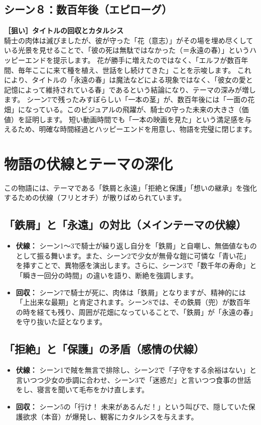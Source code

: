 \subsection{シーン８：数百年後（エピローグ）}
\textbf{［狙い］タイトルの回収とカタルシス} \\
騎士の肉体は滅びましたが、彼が守った「花（意志）」がその場を埋め尽くしている光景を見せることで、「彼の死は無駄ではなかった（＝永遠の春）」というハッピーエンドを提示します。
花が勝手に増えたのではなく、「エルフが数百年間、毎年ここに来て種を植え、世話をし続けてきた」ことを示唆します。
これにより、タイトルの「永遠の春」は魔法などによる現象ではなく、「彼女の愛と記憶によって維持されている春」であるという結論になり、テーマの深みが増します。
シーン7で残ったみすぼらしい「一本の茎」が、数百年後には「一面の花畑」になっている。このビジュアルの飛躍が、騎士の守った未来の大きさ（価値）を証明します。
短い動画時間でも「一本の映画を見た」という満足感を与えるため、明確な時間経過とハッピーエンドを用意し、物語を完璧に閉じます。

\clearpage\section{物語の伏線とテーマの深化}
この物語には、テーマである「鉄屑と永遠」「拒絶と保護」「想いの継承」を強化するための伏線（フリとオチ）が散りばめられています。

\subsection{「鉄屑」と「永遠」の対比（メインテーマの伏線）}
\begin{itemize}
    \item \textbf{伏線：} シーン1〜3で騎士が繰り返し自分を「鉄屑」と自嘲し、無価値なものとして振る舞います。また、シーン2で少女が無骨な鎧に可憐な「青い花」を挿すことで、異物感を演出します。さらに、シーン3で「数千年の寿命」と「瞬き一回分の時間」の違いを語り、断絶を強調します。
    \item \textbf{回収：} シーン7で騎士が死に、肉体は「鉄屑」となりますが、精神的には「上出来な最期」と肯定されます。シーン8では、その鉄屑（兜）が数百年の時を経ても残り、周囲が花畑になっていることで、「鉄屑」が「永遠の春」を守り抜いた証となります。
\end{itemize}

\subsection{「拒絶」と「保護」の矛盾（感情の伏線）}
\begin{itemize}
    \item \textbf{伏線：} シーン1で賊を無言で排除し、シーン2で「子守をする余裕はない」と言いつつ少女の歩調に合わせ、シーン3で「迷惑だ」と言いつつ食事の世話をし、寝言を聞いて毛布をかけ直します。
    \item \textbf{回収：} シーン5の「行け！ 未来があるんだ！」という叫びで、隠していた保護欲求（本音）が爆発し、観客にカタルシスを与えます。
\end{itemize}


